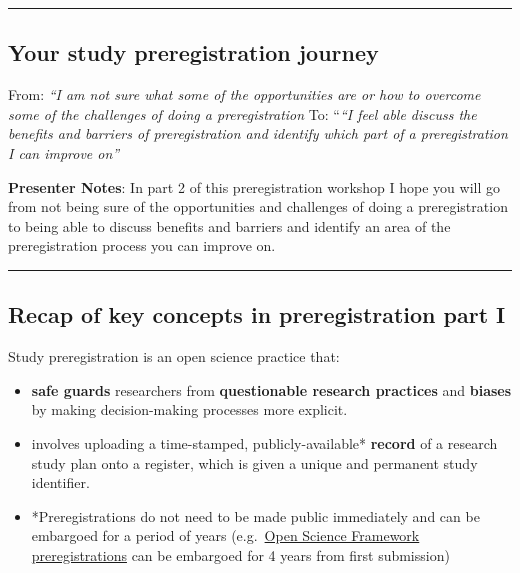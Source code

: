 \documentclass[
  letterpaper,
  DIV=11,
  numbers=noendperiod]{scrartcl}
\begin{document}
\begin{center}\rule{0.5\linewidth}{0.5pt}\end{center}

\subsection{Your study preregistration
journey}\label{your-study-preregistration-journey}

From: \emph{``I am not sure what some of the opportunities are or how to
overcome some of the challenges of doing a preregistration} To:
``\emph{``I feel able discuss the benefits and barriers of
preregistration and identify which part of a preregistration I can
improve on''}

\textbf{Presenter Notes}: In part 2 of this preregistration workshop I
hope you will go from not being sure of the opportunities and challenges
of doing a preregistration to being able to discuss benefits and
barriers and identify an area of the preregistration process you can
improve on.

\begin{center}\rule{0.5\linewidth}{0.5pt}\end{center}

\subsection{Recap of key concepts in preregistration part
I}\label{recap-of-key-concepts-in-preregistration-part-i}

Study preregistration is an open science practice that:

\begin{itemize}
\item
  \textbf{safe guards} researchers from \textbf{questionable research
  practices} and \textbf{biases} by making decision-making processes
  more explicit.
\item
  involves uploading a time-stamped, publicly-available* \textbf{record}
  of a research study plan onto a register, which is given a unique and
  permanent study identifier.
\item
  *Preregistrations do not need to be made public immediately and can be
  embargoed for a period of years
  (e.g.~\href{https://help.osf.io/article/634-addressing-fear-of-scooping-on-osf-preregistrations}{Open
  Science Framework preregistrations} can be embargoed for 4 years from
  first submission)
\end{itemize}
\end{document}

